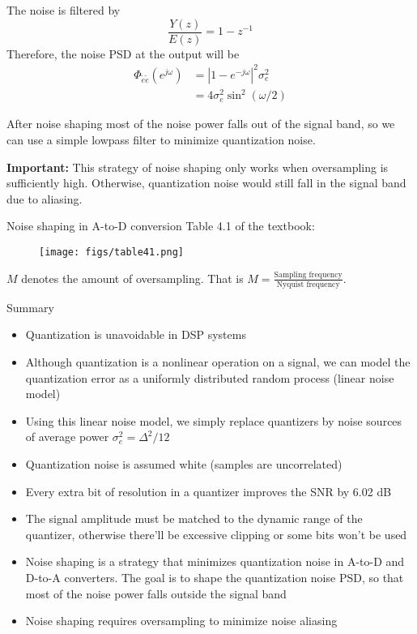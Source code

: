 \documentclass[10pt, aspectratio=169, handout]{beamer}
\begin{document}
%
\begin{frame}
The noise is filtered by
\begin{equation*}
\frac{Y(z)}{E(z)} = 1 - z^{-1} 
\end{equation*}
Therefore, the noise PSD at the output will be
\begin{align*}
\Phi_{\tilde{e}\tilde{e}}(e^{j\omega}) &= |1 - e^{-j\omega}|^2\sigma_e^2 \tag{since $e[n]$ is white} \\
&= 4\sigma_e^2\sin^2(\omega/2)
\end{align*}

\begin{center}
	\resizebox{0.6\textwidth}{!}{}
\end{center}

After noise shaping most of the noise power falls out of the signal band, so we can use a simple lowpass filter to minimize quantization noise.

\pause
\textbf{Important:} This strategy of noise shaping only works when oversampling is sufficiently high. Otherwise, quantization noise would still fall in the signal band due to aliasing.
\end{frame}

%
\begin{frame}{Noise shaping in A-to-D conversion}
Table 4.1 of the textbook:

\begin{figure}[h!]
	\centering
	\texttt{[image: figs/table41.png]}
\end{figure}

$M$ denotes the amount of oversampling. That is $M = \frac{\text{Sampling frequency}}{\text{Nyquist frequency}}$.
\end{frame}


%
\begin{frame}{Summary}
\begin{itemize}
	\item Quantization is unavoidable in DSP systems
	\item Although quantization is a nonlinear operation on a signal, we can model the quantization error as a uniformly distributed random process (linear noise model)
	\item Using this linear noise model, we simply replace quantizers by noise sources of average power $\sigma_e^2 = \Delta^2/12$
	\item Quantization noise is assumed white (samples are uncorrelated)
	\item Every extra bit of resolution in a quantizer improves the SNR by 6.02 dB
	\item The signal amplitude must be matched to the dynamic range of the quantizer, otherwise there'll be excessive clipping or some bits won't be used
	\item Noise shaping is a strategy that minimizes quantization noise in A-to-D and D-to-A converters. The goal is to shape the quantization noise PSD, so that most of the noise power falls outside the signal band
	\item Noise shaping requires oversampling to minimize noise aliasing
\end{itemize}
\end{frame}
\end{document}
